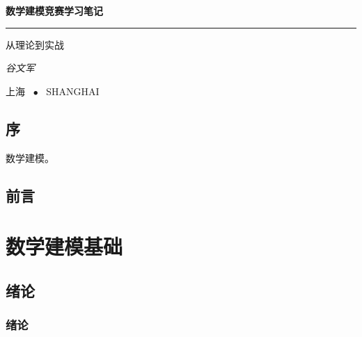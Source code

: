 \documentclass[openany]{progbookcn}
\begin{document}
\begin{titlepage}
  \vspace*{25ex}

  \hspace{0.05\textwidth}\begin{minipage}{.9\textwidth}
    \flushright

    {\textbf{数学建模竞赛学习笔记}}

    \rule{\linewidth}{.5pt}

    \vspace{2ex}

    {\textsf{从理论到实战}} \\

    \vspace{20ex}

    {\textit{谷文军}}
  \end{minipage}

  \vfill

  \centering
  {上海 ~$\bullet$ ~SHANGHAI}
\end{titlepage}
\thispagestyle{empty}


\frontmatter


\chapter{序}

数学建模。

\chapter{前言}


\clearpage
{
  \hypersetup{hidelinks}
  \tableofcontents
}


\mainmatter

\part{数学建模基础}


\chapter{绪论}



\section{绪论}
\end{document}
